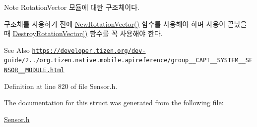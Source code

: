 \begin{DoxyNote}{Note}
Rotation\-Vector 모듈에 대한 구조체이다. \par
 구조체를 사용하기 전에 \hyperlink{Sensor_8h_a5feb892af05fc21bb647dd0203ce384e}{New\-Rotation\-Vector()} 함수를 사용해야 하며 사용이 끝났을 때 \hyperlink{Sensor_8h_a88e94d5f3af20819de0f97b12f5435b1}{Destroy\-Rotation\-Vector()} 함수를 꼭 사용해야 한다. 
\end{DoxyNote}
\begin{DoxySeeAlso}{See Also}
\href{https://developer.tizen.org/dev-guide/2.3.0/org.tizen.native.mobile.apireference/group__CAPI__SYSTEM__SENSOR__MODULE.html}{\tt https\-://developer.\-tizen.\-org/dev-\/guide/2../org.\-tizen.\-native.\-mobile.\-apireference/group\-\_\-\-\_\-\-C\-A\-P\-I\-\_\-\-\_\-\-S\-Y\-S\-T\-E\-M\-\_\-\-\_\-\-S\-E\-N\-S\-O\-R\-\_\-\-\_\-\-M\-O\-D\-U\-L\-E.\-html} 
\end{DoxySeeAlso}


Definition at line 820 of file Sensor.\-h.



The documentation for this struct was generated from the following file\-:\begin{DoxyCompactItemize}
\item 
\hyperlink{Sensor_8h}{Sensor.\-h}\end{DoxyCompactItemize}
